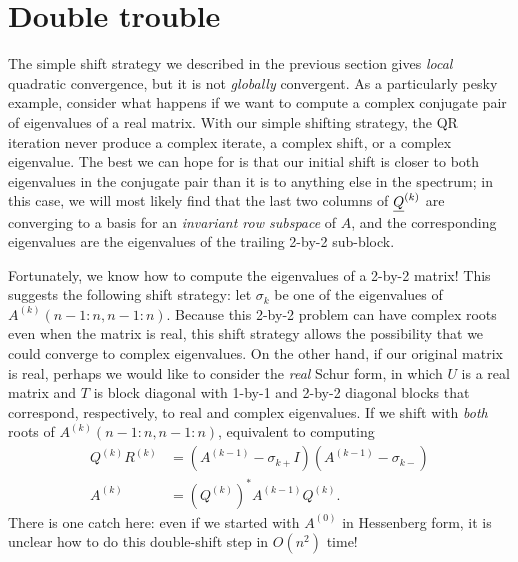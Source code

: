 \section{Double trouble}

The simple shift strategy we described in the previous section gives
{\em local} quadratic convergence, but it is not {\em globally} convergent.
%
As a particularly pesky example, consider what happens if we
want to compute a complex conjugate pair of eigenvalues of a real
matrix.  With our simple shifting strategy, 
the QR iteration
never produce a complex iterate, a
complex shift, or a complex eigenvalue.  The best we can hope for is
that our initial shift is closer to both eigenvalues in the conjugate
pair than it is to anything else in the spectrum; in this case, we
will most likely find that the last two columns of $\underline{Q}^{(k)}$ are
converging to a basis for an {\em invariant row subspace} of $A$,
and the corresponding eigenvalues are the eigenvalues of the trailing
2-by-2 sub-block.

Fortunately, we know how to compute the eigenvalues of a 2-by-2
matrix!  This suggests the following shift strategy: let $\sigma_k$ be
one of the eigenvalues of $A^{(k)}(n-1:n,n-1:n)$.  Because this 2-by-2
problem can have complex roots even when the matrix is real, this
shift strategy allows the possibility that we could converge to
complex eigenvalues. On the other hand, if our original matrix is
real, perhaps we would like to consider the {\em real} Schur form, in
which $U$ is a real matrix and $T$ is block diagonal with 1-by-1 and
2-by-2 diagonal blocks that correspond, respectively, to real and
complex eigenvalues.  If we shift with {\em both} roots of
$A^{(k)}(n-1:n,n-1:n)$, equivalent to computing
\begin{align*}
  Q^{(k)} R^{(k)} &= (A^{(k-1)} - \sigma_{k+} I)(A^{(k-1)} - \sigma_{k-}) \\
  A^{(k)} &= (Q^{(k)})^* A^{(k-1)} Q^{(k)}. \label{sqr-2}
\end{align*}
There is one catch here: even if we started with $A^{(0)}$ in Hessenberg
form, it is unclear how to do this double-shift step in $O(n^2)$ time!


